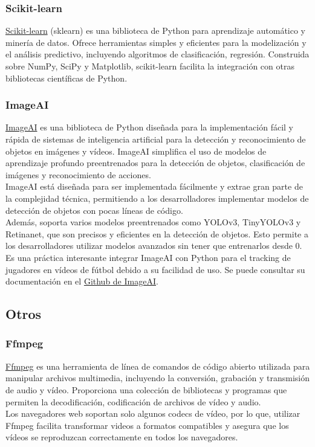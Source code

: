 \subsubsection{Scikit-learn}
\href{https://scikit-learn.org/stable/}{Scikit-learn} (sklearn) es una biblioteca de Python para aprendizaje automático y minería de datos. Ofrece herramientas simples y eficientes para la modelización y el análisis predictivo, incluyendo algoritmos de clasificación, regresión. Construida sobre NumPy, SciPy y Matplotlib, scikit-learn facilita la integración con otras bibliotecas científicas de Python.

\subsubsection{ImageAI}
\href{https://imageai.readthedocs.io/en/latest/}{ImageAI} es una biblioteca de Python diseñada para la implementación fácil y rápida de sistemas de inteligencia artificial para la detección y reconocimiento de objetos en imágenes y vídeos. ImageAI simplifica el uso de modelos de aprendizaje profundo preentrenados para la detección de objetos, clasificación de imágenes y reconocimiento de acciones. \\
ImageAI está diseñada para ser implementada fácilmente y extrae gran parte de la complejidad técnica, permitiendo a los desarrolladores implementar modelos de detección de objetos con pocas líneas de código.\\
Además, soporta varios modelos preentrenados como YOLOv3, TinyYOLOv3 y Retinanet, que son precisos y eficientes en la detección de objetos. Esto permite a los desarrolladores utilizar modelos avanzados sin tener que entrenarlos desde 0. \\
Es una práctica interesante integrar ImageAI con Python para el tracking de jugadores en vídeos de fútbol debido a su facilidad de uso. Se puede consultar su documentación en el \href{https://github.com/OlafenwaMoses/ImageAI}{Github de ImageAI}.
\subsection{Otros}
\subsubsection{Ffmpeg}
\href{https://ffmpeg.org/}{Ffmpeg} es una herramienta de línea de comandos de código abierto utilizada para manipular archivos multimedia, incluyendo la conversión, grabación y transmisión de audio y vídeo. Proporciona una colección de bibliotecas y programas que permiten la decodificación, codificación de archivos de vídeo y audio. \\
Los navegadores web soportan solo algunos codecs de vídeo, por lo que, utilizar Ffmpeg facilita transformar videos a formatos compatibles y asegura que los vídeos se reproduzcan correctamente en todos los navegadores.
